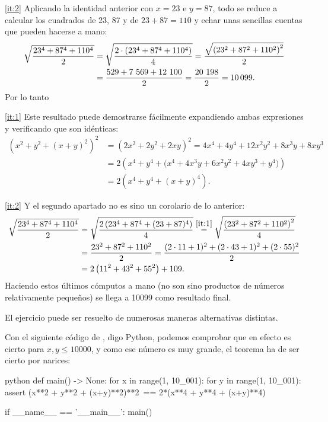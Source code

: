 \documentclass[
	fecha={5 de agosto de 2025},
	palabrasclave={RetoSecundaria, ago2025, álgebra, dif1},
	codigo=minted
]{RetoMatematico}
\begin{document}
\ref{it:2} Aplicando la identidad anterior con $x = 23$ e $y = 87$, todo se reduce a calcular los
cuadrados de 23, 87 y de $23 + 87 = 110$ y echar unas sencillas cuentas que pueden hacerse
a mano: \begin{align*}
	\sqrt{\frac{23^4+87^4+110^4}{2}} &= \sqrt{\frac{2\cdot\left(23^4+87^4+110^4\right)}{4}} = \frac{\sqrt{\left(23^2+87^2+110^2\right)^2}}{2}\\
	&= \frac{529 + 7\ 569 + 12\ 100}{2} = \frac{20\ 198}{2} = \num{10099}.
\end{align*} Por lo tanto 


\forma
\ref{it:1} Este resultado puede demostrarse fácilmente expandiendo ambas expresiones y verificando que son idénticas: 
\begin{align*}
    \left(x^2 + y^2 + (x+y)^2\right)^2 &= \left(2x^2 + 2y^2 + 2xy\right)^2 = 4x^4 + 4y^4 + 12x^2y^2 + 8x^3y + 8xy^3\\
    &= 2\left(x^4 + y^4 + \big(x^4 + 4x^3 y + 6x^2y^2 + 4 xy^3 + y^4\big)\right)\\
	&= 2\left(x^4 + y^4 + (x+y)^4\right).
\end{align*}

\ref{it:2} Y el segundo apartado no es sino un corolario de lo anterior: \begin{align*}
    \sqrt{\frac{23^4 + 87^4 + 110^4}{2}} &= \sqrt{\frac{2\left(23^4 + 87^4 + (23+87)^4\right)}{4}} \overset{\ref{it:1}}{=} \sqrt{\frac{\left(23^2 + 87^2 + 110^2\right)^2}{4}}\\
	&= \frac{23^2 + 87^2 + 110^2}{2} = \frac{(2\cdot 11 + 1)^2 + (2\cdot 43 + 1)^2 + (2\cdot 55)^2}{2}\\
	&= 2\left(11^2 + 43^2 + 55^2\right) + 109.
\end{align*} Haciendo estos últimos cómputos a mano (no son sino productos de números relativamente pequeños) se llega a \num{10099} como resultado final.

\forma

El ejercicio puede ser resuelto de numerosas maneras alternativas distintas.

Con el siguiente código de \mathematica, digo Python, podemos comprobar que en efecto es cierto para $x,y\leq \num{10000}$, y como ese número es muy grande, el teorema ha de ser cierto por narices:
\begin{codigo}{python}
def main() -> None:
	for x in range(1, 10_001):
		for y in range(1, 10_001):
			assert (x**2 + y**2 + (x+y)**2)**2\
			    == 2*(x**4 + y**4 + (x+y)**4)

if __name__ == '__main__': main()
\end{codigo}
\end{document}
